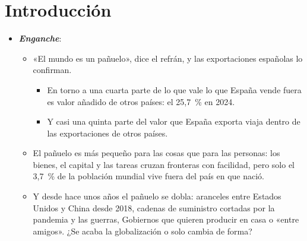 \documentclass[11pt]{article}
\begin{document}
\tceetitulo

\section*{Introducción}

\begin{itemize}
\item \textbf{\emph{Enganche}}:
  \begin{itemize}
  \item «El mundo es un pañuelo», dice el refrán, y las exportaciones españolas lo confirman.
    \begin{itemize}
    \item En torno a una cuarta parte de lo que vale lo que España vende fuera es valor añadido de otros países: el 25,7~\% en 2024\nocite{Eurostat2026FIGAROcgv}.
    \item Y casi una quinta parte del valor que España exporta viaja dentro de las exportaciones de otros países\nocite{Eurostat2026FIGAROcgv}.
    \end{itemize}
  \item El pañuelo es más pequeño para las cosas que para las personas: los bienes, el capital y las tareas cruzan fronteras con facilidad, pero solo el 3,7~\% de la población mundial vive fuera del país en que nació\nocite{ONU2025MigrantStock}.
  \item Y desde hace unos años el pañuelo se dobla: aranceles entre Estados Unidos y China desde 2018\nocite{USTR2026Seccion301}, cadenas de suministro cortadas por la pandemia y las guerras, Gobiernos que quieren producir en casa o «entre amigos». ¿Se acaba la globalización o solo cambia de forma?
  \end{itemize}


\end{itemize}
\end{document}
